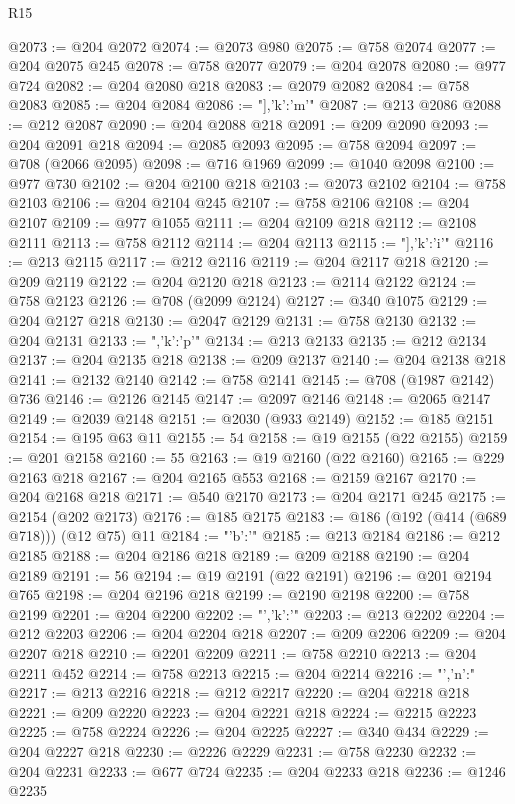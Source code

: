 \begin{lexlean}{R15}
\begin{coremodule}
{{{{{{{@2073 := @204 @2072
@2074 := @2073 @980
@2075 := @758 @2074
@2077 := @204 @2075 @245
@2078 := @758 @2077
@2079 := @204 @2078
@2080 := @977 @724
@2082 := @204 @2080 @218
@2083 := @2079 @2082
@2084 := @758 @2083
@2085 := @204 @2084
@2086 := "],'k':'m'}"
@2087 := @213 @2086
@2088 := @212 @2087
@2090 := @204 @2088 @218
@2091 := @209 @2090
@2093 := @204 @2091 @218
@2094 := @2085 @2093
@2095 := @758 @2094
@2097 := @708 (@2066 @2095)
@2098 := @716 @1969
@2099 := @1040 @2098
@2100 := @977 @730
@2102 := @204 @2100 @218
@2103 := @2073 @2102
@2104 := @758 @2103
@2106 := @204 @2104 @245
@2107 := @758 @2106
@2108 := @204 @2107
@2109 := @977 @1055
@2111 := @204 @2109 @218
@2112 := @2108 @2111
@2113 := @758 @2112
@2114 := @204 @2113
@2115 := "],'k':'i'}"
@2116 := @213 @2115
@2117 := @212 @2116
@2119 := @204 @2117 @218
@2120 := @209 @2119
@2122 := @204 @2120 @218
@2123 := @2114 @2122
@2124 := @758 @2123
@2126 := @708 (@2099 @2124)
@2127 := @340 @1075
@2129 := @204 @2127 @218
@2130 := @2047 @2129
@2131 := @758 @2130
@2132 := @204 @2131
@2133 := ",'k':'p'}"
@2134 := @213 @2133
@2135 := @212 @2134
@2137 := @204 @2135 @218
@2138 := @209 @2137
@2140 := @204 @2138 @218
@2141 := @2132 @2140
@2142 := @758 @2141
@2145 := @708 (@1987 @2142) @736
@2146 := @2126 @2145
@2147 := @2097 @2146
@2148 := @2065 @2147
@2149 := @2039 @2148
@2151 := @2030 (@933 @2149)
@2152 := @185 @2151
@2154 := @195 @63 @11
@2155 := 54
@2158 := @19 @2155 (@22 @2155)
@2159 := @201 @2158
@2160 := 55
@2163 := @19 @2160 (@22 @2160)
@2165 := @229 @2163 @218
@2167 := @204 @2165 @553
@2168 := @2159 @2167
@2170 := @204 @2168 @218
@2171 := @540 @2170
@2173 := @204 @2171 @245
@2175 := @2154 (@202 @2173)
@2176 := @185 @2175
@2183 := @186 (@192 (@414 (@689 @718))) (@12 @75) @11
@2184 := "{'b':'"
@2185 := @213 @2184
@2186 := @212 @2185
@2188 := @204 @2186 @218
@2189 := @209 @2188
@2190 := @204 @2189
@2191 := 56
@2194 := @19 @2191 (@22 @2191)
@2196 := @201 @2194 @765
@2198 := @204 @2196 @218
@2199 := @2190 @2198
@2200 := @758 @2199
@2201 := @204 @2200
@2202 := "','k':'"
@2203 := @213 @2202
@2204 := @212 @2203
@2206 := @204 @2204 @218
@2207 := @209 @2206
@2209 := @204 @2207 @218
@2210 := @2201 @2209
@2211 := @758 @2210
@2213 := @204 @2211 @452
@2214 := @758 @2213
@2215 := @204 @2214
@2216 := "','n':"
@2217 := @213 @2216
@2218 := @212 @2217
@2220 := @204 @2218 @218
@2221 := @209 @2220
@2223 := @204 @2221 @218
@2224 := @2215 @2223
@2225 := @758 @2224
@2226 := @204 @2225
@2227 := @340 @434
@2229 := @204 @2227 @218
@2230 := @2226 @2229
@2231 := @758 @2230
@2232 := @204 @2231
@2233 := @677 @724
@2235 := @204 @2233 @218
@2236 := @1246 @2235
}}}}}
\end{coremodule}
\end{lexlean}
